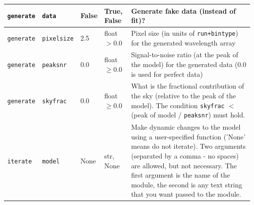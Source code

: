 \begin{center}
\begin{longtable}{p{1.5cm}p{2.5cm}p{2.0cm}p{2.0cm}p{5.0cm}}
\multicolumn{1}{p{1.5cm}}{\texttt{generate}} &
\multicolumn{1}{p{2.5cm}}{\texttt{data}} &
\multicolumn{1}{p{2.0cm}}{False} &
\multicolumn{1}{p{2.0cm}}{True, False} &
\multicolumn{1}{p{5.0cm}}{Generate fake data (instead of fit)?} \\ \midrule

\multicolumn{1}{p{1.5cm}}{\texttt{generate}} &
\multicolumn{1}{p{2.5cm}}{\texttt{pixelsize}} &
\multicolumn{1}{p{2.0cm}}{2.5} &
\multicolumn{1}{p{2.0cm}}{float $>0.0$} &
\multicolumn{1}{p{5.0cm}}{Pixel size (in units of \texttt{run+bintype}) for the generated wavelength array} \\ \midrule

\multicolumn{1}{p{1.5cm}}{\texttt{generate}} &
\multicolumn{1}{p{2.5cm}}{\texttt{peaksnr}} &
\multicolumn{1}{p{2.0cm}}{0.0} &
\multicolumn{1}{p{2.0cm}}{float $\ge0.0$} &
\multicolumn{1}{p{5.0cm}}{Signal-to-noise ratio (at the peak of the model) for the generated data (0.0 is used for perfect data)} \\ \midrule

\multicolumn{1}{p{1.5cm}}{\texttt{generate}} &
\multicolumn{1}{p{2.5cm}}{\texttt{skyfrac}} &
\multicolumn{1}{p{2.0cm}}{0.0} &
\multicolumn{1}{p{2.0cm}}{float $\ge0.0$} &
\multicolumn{1}{p{5.0cm}}{What is the fractional contribution of the sky (relative to the peak of the model). The condition \texttt{skyfrac} $<$ (peak of model / \texttt{peaksnr}) must hold.} \\ \midrule

\multicolumn{1}{p{1.5cm}}{\texttt{iterate}} &
\multicolumn{1}{p{2.5cm}}{\texttt{model}} &
\multicolumn{1}{p{2.0cm}}{None} &
\multicolumn{1}{p{2.0cm}}{str, None} &
\multicolumn{1}{p{5.0cm}}{Make dynamic changes to the model using a user-specified function ('None' means do not iterate). Two arguments (separated by a comma - no spaces) are allowed, but not necessary. The first argument is the name of the module, the second is any text string that you want passed to the module.} \\ \midrule






\end{longtable}
\end{center}

